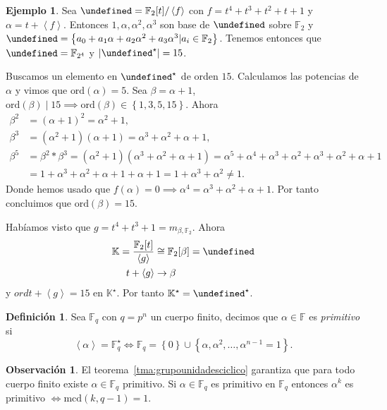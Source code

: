 \documentclass[10pt, spanish]{report}
\theoremstyle{definition}
\newtheorem*{defin}{Definición}
\newtheorem*{ej}{Ejemplo}
\newtheorem*{obs}{Observación}
\newcommand{\F}{\mathbb{F}}
\newcommand{\K}{\mathbb{K}}
\let\L\undefined
\newcommand{\L}{\mathbb{L}}
\newcommand{\ord}[1]{\text{ord}(#1)}
\newcommand{\mcd}[1]{\text{mcd}(#1)}
\newcommand{\fecha}[1]{\marginpar{\underline{\footnotesize{#1}}}}
\begin{document}
\fecha{17/03}
\begin{ej}
    Sea $\L=\F_2[t]/\left<f\right>$ con $f=t^4+t^3+t^2+t+1$ y $\alpha=t+\left<f
    \right>$. Entonces $1,\alpha,\alpha^2,\alpha^3$ son base de $\L$ sobre
    $\F_2$ y $\L=\left\{a_0+a_1\alpha+a_2\alpha^2+a_3\alpha^3|a_i\in\F_2
    \right\}$. Tenemos entonces que $\L=\F_{2^4}$ y $\left|\L^\star\right|=15$.

    Buscamos un elemento en $\L^\star$ de orden $15$. Calculamos las potencias
    de $\alpha$ y vimos que $\ord{\alpha}=5$. Sea $\beta=\alpha+1$, $\ord{\beta}
    \mid 15\implies\ord{\beta}\in\left\{1,3,5,15\right\}$. Ahora
    \begin{align*}
        \beta^2&=(\alpha+1)^2=\alpha^2+1,\\
        \beta^3&=(\alpha^2+1)(\alpha+1)=\alpha^3+\alpha^2+\alpha+1,\\
        \beta^5&=\beta^2*\beta^3=(\alpha^2+1)(\alpha^3+\alpha^2+\alpha+1)=
        \alpha^5+\alpha^4+\alpha^3+\alpha^2+\alpha^3+\alpha^2+\alpha+1\\
               &=1+\alpha^3+\alpha^2+\alpha+1+\alpha+1=1+\alpha^3+\alpha^2\neq1
    .\end{align*}
    Donde hemos usado que $f(\alpha)=0\implies
    \alpha^4=\alpha^3+\alpha^2+\alpha+1$. Por tanto concluimos que
    $\ord{\beta}=15$.

    Habíamos visto que $g=t^4+t^3+1=m_{\beta,\F_2}$. Ahora
    \begin{align*}
        \K=\frac{\F_2[t]}{\left<g\right>}&\cong\F_2[\beta]=\L\\
        t+\left<g\right>&\to\beta
    \end{align*}
    y $ord{t+\left< g \right>}=15$ en $\K^\star$. Por tanto $\K^\star=\L^\star$.
\end{ej}

\begin{defin}
    Sea $\F_q$ con $q=p^n$ un cuerpo finito, decimos que $\alpha\in\F$ es
    \textit{primitivo} si \[\left<\alpha\right>=\F_q^\star\Leftrightarrow \F_q
    =\left\{0\right\}\cup\left\{\alpha,\alpha^2,\ldots,\alpha^{n-1}=1\right\}.\]
\end{defin}

\begin{obs}
    El teorema~\ref{tma:grupounidadesciclico} garantiza que para todo cuerpo
    finito existe $\alpha\in\F_q$ primitivo. Si $\alpha\in\F_q$ es primitivo en
    $\F_q$ entonces $\alpha^k$ es primitivo $\Leftrightarrow\mcd{k,q-1}=1$.
\end{obs}
\end{document}
